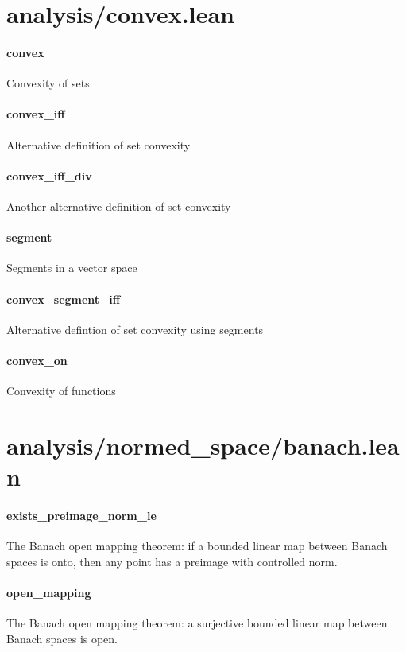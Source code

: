 \documentclass{article}
\begin{document}
\section{analysis/convex.lean}\paragraph{convex}
\par
Convexity of sets
\paragraph{convex\_iff}
\par
Alternative definition of set convexity
\paragraph{convex\_iff\_div}
\par
Another alternative definition of set convexity
\paragraph{segment}
\par
Segments in a vector space
\paragraph{convex\_segment\_iff}
\par
Alternative defintion of set convexity using segments
\paragraph{convex\_on}
\par
Convexity of functions
\section{analysis/normed\_space/banach.lean}\paragraph{exists\_preimage\_norm\_le}
\par
The Banach open mapping theorem: if a bounded linear map between Banach spaces is onto, then
any point has a preimage with controlled norm.
\paragraph{open\_mapping}
\par
The Banach open mapping theorem: a surjective bounded linear map between Banach spaces is open.
\end{document}
